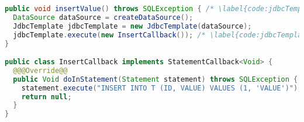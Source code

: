 

\begin{lstlisting}[language=Java, caption={Example of loading data using Spring JDBC Framework}, label={code:jdbcTemplate:callbacks}]
public void insertValue() throws SQLException { /* \label{code:jdbcTemplate:callbacks:method} */
  DataSource dataSource = createDataSource();
  JdbcTemplate jdbcTemplate = new JdbcTemplate(dataSource);
  jdbcTemplate.execute(new InsertCallback()); /* \label{code:jdbcTemplate:callbacks:executeCallback} */
}

public class InsertCallback implements StatementCallback<Void> {
  @@@Override@@
  public Void doInStatement(Statement statement) throws SQLException {
    statement.execute("INSERT INTO T (ID, VALUE) VALUES (1, 'VALUE')"); /* \label{code:jdbcTemplate:callbacks:executeInsert} */
    return null;
  }
}
\end{lstlisting}

